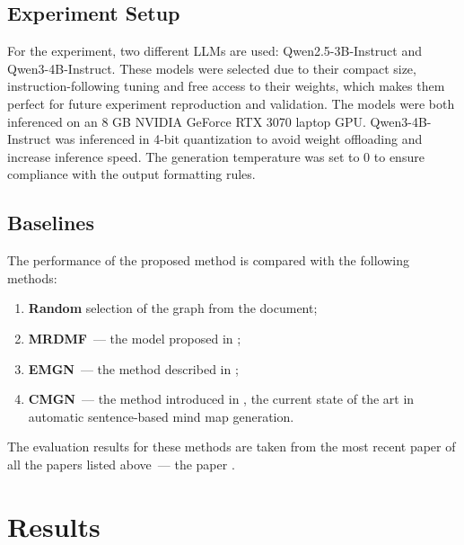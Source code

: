 \documentclass{article}
\begin{document}
\subsection{Experiment Setup}
For the experiment, two different LLMs are used: Qwen2.5-3B-Instruct and Qwen3-4B-Instruct. These models were selected due to their compact size, instruction-following tuning and free access to their weights, which makes them perfect for future experiment reproduction and validation. The models were both inferenced on an 8 GB NVIDIA GeForce RTX 3070 laptop GPU. Qwen3-4B-Instruct was inferenced in 4-bit quantization to avoid weight offloading and increase inference speed. The generation temperature was set to 0 to ensure compliance with the output formatting rules.

\subsection{Baselines}
The performance of the proposed method is compared with the following methods:
\begin{enumerate}
    \item \textbf{Random} selection of the graph from the document;
    \item \textbf{MRDMF}~--- the model proposed in \cite{wei2019revealing};
    \item \textbf{EMGN}~--- the method described in \cite{hu2021efficient};
    \item \textbf{CMGN}~--- the method introduced in \cite{zhang2024coreference}, the current state of the art in automatic sentence-based mind map generation.
\end{enumerate}
The evaluation results for these methods are taken from the most recent paper of all the papers listed above~--- the paper  \cite{zhang2024coreference}.

\section{Results}
\end{document}
